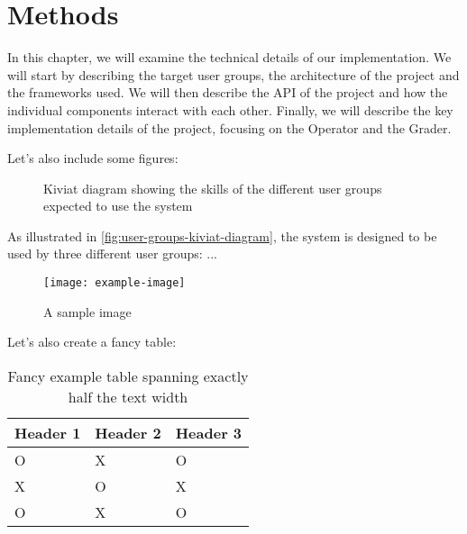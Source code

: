 \documentclass[../thesis.tex]{subfiles}
\begin{document}
    \chapter{Methods}\label{ch:methods}
    In this chapter, we will examine the technical details of our implementation. We will start by describing the target user groups, the architecture of the project and the frameworks used. We will then describe the API of the project and how the individual components interact with each other. Finally, we will describe the key implementation details of the project, focusing on the Operator and the Grader.

    Let's also include some figures:

    \begin{figure}[ht!]
        \centering
        
        \caption{Kiviat diagram showing the skills of the different user groups expected to use the system}
        \label{fig:user-groups-kiviat-diagram}
    \end{figure}
    \FloatBarrier{}

    As illustrated in \autoref{fig:user-groups-kiviat-diagram}, the system is designed to be used by three different user groups: ...
    \begin{figure}[ht!]
        \centering
        \texttt{[image: example-image]}
        \caption{A sample image}
        \label{fig:sample-image}
    \end{figure}

    Let's also create a fancy table:
    \begin{table}[ht]
        \centering
        \begin{tabularx}{.5\textwidth}{|l|l|X|}
            \toprule
            \textbf{\textsf{Header 1}} & \textbf{\textsf{Header 2}} & \textbf{\textsf{Header 3}} \\
            \midrule
            O                          & X                          & O                          \\
            X                          & O                          & X                          \\
            O                          & X                          & O                          \\
            \bottomrule
        \end{tabularx}
        \caption{Fancy example table spanning exactly half the text width}
        \label{tab:example-table}
    \end{table}
\end{document}
